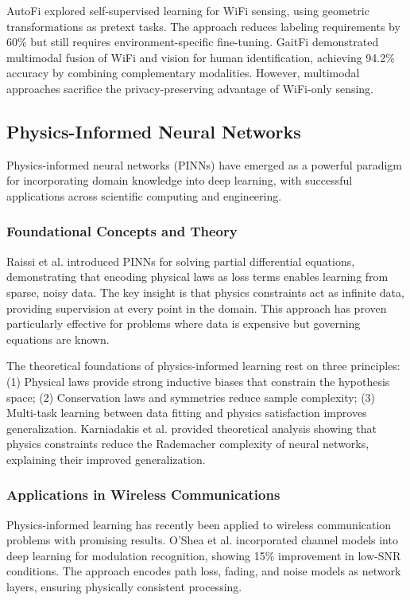 \documentclass[10pt,journal,compsoc]{IEEEtran}
\begin{document}
AutoFi \cite{autofi2022} explored self-supervised learning for WiFi sensing, using geometric transformations as pretext tasks. The approach reduces labeling requirements by 60\% but still requires environment-specific fine-tuning. GaitFi \cite{gaitfi2022} demonstrated multimodal fusion of WiFi and vision for human identification, achieving 94.2\% accuracy by combining complementary modalities. However, multimodal approaches sacrifice the privacy-preserving advantage of WiFi-only sensing.

\subsection{Physics-Informed Neural Networks}

Physics-informed neural networks (PINNs) have emerged as a powerful paradigm for incorporating domain knowledge into deep learning, with successful applications across scientific computing and engineering.

\subsubsection{Foundational Concepts and Theory}

Raissi et al. \cite{raissi2019physics} introduced PINNs for solving partial differential equations, demonstrating that encoding physical laws as loss terms enables learning from sparse, noisy data. The key insight is that physics constraints act as infinite data, providing supervision at every point in the domain. This approach has proven particularly effective for problems where data is expensive but governing equations are known.

The theoretical foundations of physics-informed learning rest on three principles: (1) Physical laws provide strong inductive biases that constrain the hypothesis space; (2) Conservation laws and symmetries reduce sample complexity; (3) Multi-task learning between data fitting and physics satisfaction improves generalization. Karniadakis et al. \cite{karniadakis2021physics} provided theoretical analysis showing that physics constraints reduce the Rademacher complexity of neural networks, explaining their improved generalization.

\subsubsection{Applications in Wireless Communications}

Physics-informed learning has recently been applied to wireless communication problems with promising results. O'Shea et al. \cite{oshea2017physical} incorporated channel models into deep learning for modulation recognition, showing 15\% improvement in low-SNR conditions. The approach encodes path loss, fading, and noise models as network layers, ensuring physically consistent processing.
\end{document}
